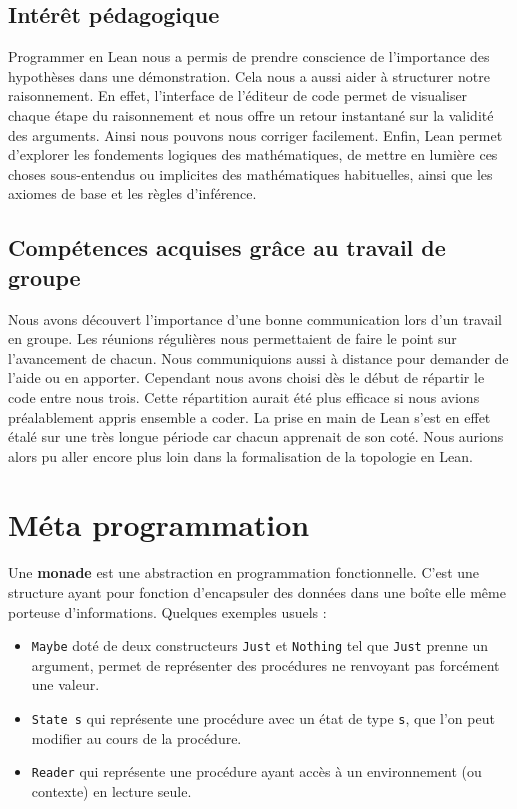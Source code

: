 \documentclass[a4paper, 12pt]{article}
\newcommand{\haskell}[1]{\texttt{#1}}
\begin{document}
\begin{itemize}
\subsection{Intérêt pédagogique}

Programmer en Lean nous a permis de prendre conscience de l’importance des hypothèses dans une démonstration. Cela nous a aussi aider à structurer notre raisonnement. En effet, l’interface de l’éditeur de code permet de visualiser chaque étape du raisonnement et nous offre un retour instantané sur la validité des arguments. Ainsi nous pouvons nous corriger facilement. Enfin, Lean permet d'explorer les fondements logiques des mathématiques, de mettre en lumière ces choses sous-entendus ou implicites des mathématiques habituelles, ainsi que les axiomes de base et les règles d'inférence.


\subsection{Compétences acquises grâce au travail de groupe}

Nous avons découvert l’importance d’une bonne communication lors d’un travail en groupe. Les réunions régulières nous permettaient de faire le point sur l’avancement de chacun. Nous communiquions aussi à distance pour demander de l’aide ou en apporter. Cependant nous avons choisi dès le début de répartir le code entre nous trois. Cette répartition aurait été plus efficace si nous avions préalablement appris ensemble a coder. La prise en main de Lean s’est en effet étalé sur une très longue période car chacun apprenait de son coté. Nous aurions alors pu aller encore plus loin dans la formalisation de la topologie en Lean.

\newpage

\appendix

\section{Méta programmation}

Une \textbf{monade} est une abstraction en programmation fonctionnelle. C'est une structure ayant pour fonction d'encapsuler des données dans une boîte elle même porteuse d'informations. Quelques exemples usuels :

\begin{itemize}
    \item \haskell{Maybe} doté de deux constructeurs \haskell{Just} et \haskell{Nothing} tel que \haskell{Just} prenne un argument, permet de représenter des procédures ne renvoyant pas forcément une valeur.
    \item \haskell{State s} qui représente une procédure avec un état de type \haskell{s}, que l'on peut modifier au cours de la procédure.
    \item \haskell{Reader} qui représente une procédure ayant accès à un environnement (ou contexte) en lecture seule.
\end{itemize}


\end{itemize}
\end{document}

